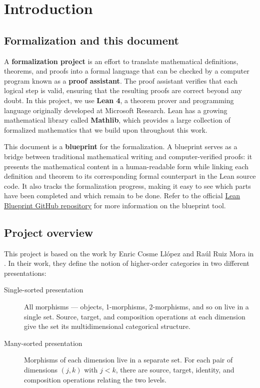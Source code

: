 \chapter{Introduction}
\label{chp:introduction}

\section{Formalization and this document}

A \textbf{formalization project} is an effort to translate mathematical definitions, theorems, and
proofs into a formal language that can be checked by a computer program known as a \textbf{proof
assistant}. The proof assistant verifies that each logical step is valid, ensuring that the
resulting proofs are correct beyond any doubt. In this project, we use \textbf{Lean 4}, a theorem
prover and programming language originally developed at Microsoft Research. Lean has a growing
mathematical library called \textbf{Mathlib}, which provides a large collection of formalized
mathematics that we build upon throughout this work.

This document is a \textbf{blueprint} for the formalization. A blueprint serves as a bridge between
traditional mathematical writing and computer-verified proofs: it presents the mathematical content
in a human-readable form while linking each definition and theorem to its corresponding formal
counterpart in the Lean source code. It also tracks the formalization progress, making it easy to
see which parts have been completed and which remain to be done. Refer to the official
\href{https://github.com/PatrickMassot/leanblueprint}{Lean Blueprint GitHub repository} for more
information on the blueprint tool.

\section{Project overview}

This project is based on the work by Enric Cosme Llópez and Raúl Ruiz Mora in
\cite{vidal2024higher}. In their work, they define the notion of higher-order categories in two
different presentations:

\begin{description}
  \item[Single-sorted presentation] All morphisms --- objects, 1-morphisms, 2-morphisms, and so on
    live in a single set. Source, target, and composition operations at each dimension give the set
    its multidimensional categorical structure.
  \item[Many-sorted presentation] Morphisms of each dimension live in a separate set. For each pair
    of dimensions $(j, k)$ with $j < k$, there are source, target, identity, and composition
    operations relating the two levels.
\end{description}

